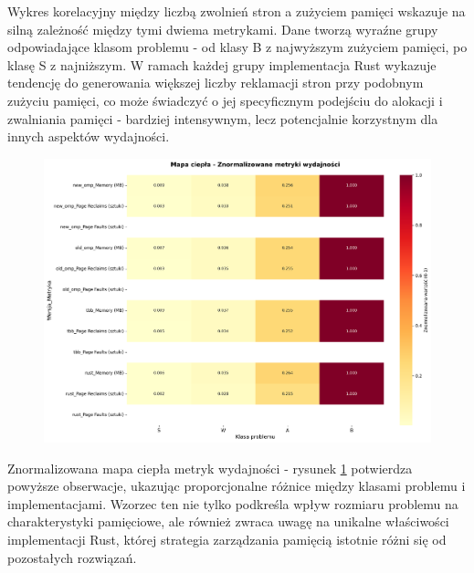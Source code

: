 Wykres korelacyjny między liczbą zwolnień stron a zużyciem pamięci wskazuje na silną zależność między tymi dwiema metrykami. Dane tworzą wyraźne grupy odpowiadające klasom problemu - od klasy B z najwyższym zużyciem pamięci, po klasę S z najniższym. W ramach każdej grupy implementacja Rust wykazuje tendencję do generowania większej liczby reklamacji stron przy podobnym zużyciu pamięci, co może świadczyć o jej specyficznym podejściu do alokacji i zwalniania pamięci - bardziej intensywnym, lecz potencjalnie korzystnym dla innych aspektów wydajności.
\begin{figure}[H]
    \centering
    \includegraphics[width=\textwidth]{analiza/images/parallel/is/x86/chart_03_heatmap.png}
    \caption{}
    \label{is_heatmap_wydajnosci_x86}
\end{figure}
Znormalizowana mapa ciepła metryk wydajności - rysunek \ref{is_heatmap_wydajnosci_x86} potwierdza powyższe obserwacje, ukazując proporcjonalne różnice między klasami problemu i implementacjami. Wzorzec ten nie tylko podkreśla wpływ rozmiaru problemu na charakterystyki pamięciowe, ale również zwraca uwagę na unikalne właściwości implementacji Rust, której strategia zarządzania pamięcią istotnie różni się od pozostałych rozwiązań.

